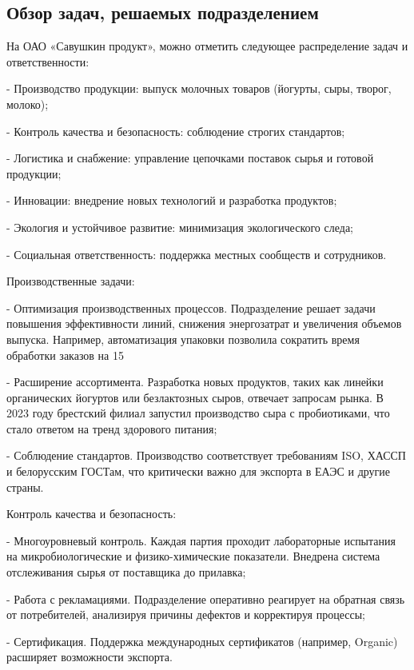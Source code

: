 \subtitlespace

\subsection*{  
  \gostTitleFont
   Обзор задач, решаемых подразделением
} 

\subtitlespace

{\gostFont

  \par \redline На ОАО «Савушкин продукт», можно отметить следующее распределение задач и ответственности:
  \par \redline - Производство продукции: выпуск молочных товаров (йогурты, сыры, творог, молоко);
  \par \redline - Контроль качества и безопасность: соблюдение строгих стандартов;
  \par \redline - Логистика и снабжение: управление цепочками поставок сырья и готовой продукции;
  \par \redline - Инновации: внедрение новых технологий и разработка продуктов;
  \par \redline - Экология и устойчивое развитие: минимизация экологического следа;
  \par \redline - Социальная ответственность: поддержка местных сообществ и сотрудников.

  \par \redline Производственные задачи:
  \par \redline - Оптимизация производственных процессов. Подразделение решает задачи повышения эффективности линий, снижения энергозатрат и увеличения объемов выпуска. Например, автоматизация упаковки позволила сократить время обработки заказов на 15%
  \par \redline - Расширение ассортимента. Разработка новых продуктов, таких как линейки органических йогуртов или безлактозных сыров, отвечает запросам рынка. В 2023 году брестский филиал запустил производство сыра с пробиотиками, что стало ответом на тренд здорового питания;
  \par \redline - Соблюдение стандартов. Производство соответствует требованиям ISO, ХАССП и белорусским ГОСТам, что критически важно для экспорта в ЕАЭС и другие страны.

  \par \redline Контроль качества и безопасность:
  \par \redline - Многоуровневый контроль. Каждая партия проходит лабораторные испытания на микробиологические и физико-химические показатели. Внедрена система отслеживания сырья от поставщика до прилавка;
  \par \redline - Работа с рекламациями. Подразделение оперативно реагирует на обратная связь от потребителей, анализируя причины дефектов и корректируя процессы;
  \par \redline - Сертификация. Поддержка международных сертификатов (например, Organic) расширяет возможности экспорта.

}

